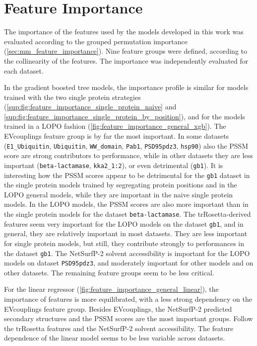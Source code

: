 \section{Feature Importance}\label{sec:res:feature_imp}
The importance of the features used by the models developed in this work was evaluated according to the grouped permutation importance (\cref{sec:mm_feature_importance}).
Nine feature groups were defined, according to the collinearity of the features.
The importance was independently evaluated for each dataset.

In the gradient boosted tree models, the importance profile is similar for models trained with the two single protein strategies (\cref{sup:fig:feature_importance_single_protein_naive} and \cref{sup:fig:feature_importance_single_protein_by_position}), and for the models trained in a LOPO fashion (\cref{fig:feature_importance_general_xgb}).
The EVcouplings feature group is by far the most important.
In some datasets (\texttt{E1\_Ubiquitin}, \texttt{Ubiquitin}, \texttt{WW\_domain}, \texttt{Pab1}, \texttt{PSD95pdz3}, \texttt{hsp90}) also the PSSM score are strong contributors to performance, while in other datasets they are less important (\texttt{beta-lactamase}, \texttt{kka2\_1:2}), or even detrimental (\texttt{gb1}).
It is interesting how the PSSM scores appear to be detrimental for the \texttt{gb1} dataset in the single protein models trained by segregating protein positions and in the LOPO general models, while they are important in the naive single protein models.
In the LOPO models, the PSSM scores are also more important than in the single protein models for the dataset \texttt{beta-lactamase}.
The trRosetta-derived features seem very important for the LOPO models on the dataset \texttt{gb1}, and in general, they are relatively important in most datasets.
They are less important for single protein models, but still, they contribute strongly to performances in the dataset \texttt{gb1}.
The NetSurfP-2 solvent accessibility is important for the LOPO models on dataset \texttt{PSD95pdz3}, and moderately important for other models and on other datasets.
The remaining feature groups seem to be less critical.

For the linear regressor (\cref{fig:feature_importance_general_linear}), the importance of features is more equilibrated, with a less strong dependency on the EVcouplings feature group.
Besides EVcouplings, the NetSurfP-2 predicted secondary structures and the PSSM scores are the most important groups.
Follow the trRosetta features and the NetSurfP-2 solvent accessibility.
The feature dependence of the linear model seems to be less variable across datasets.

